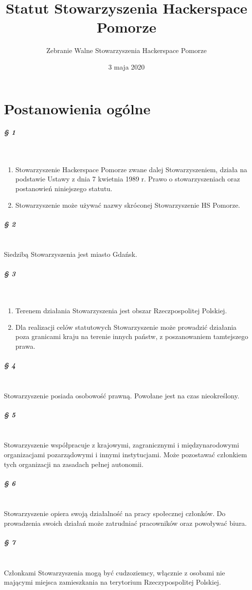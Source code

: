 \documentclass{article}
\title{Statut Stowarzyszenia Hackerspace Pomorze}
\author{Zebranie Walne Stowarzyszenia Hackerspace Pomorze}
\date{3 maja 2020}
\begin{document}
\setlength\parindent{0pt}
\renewcommand{\baselinestretch}{0} 

\renewcommand\thesection{Rozdział \Roman{section}.}

\newcommand{\myparagraph}[1]{\needspace{16ex}\begin{center}\subparagraph{#1}\end{center}\\}

\maketitle

\section{Postanowienia ogólne}
\myparagraph{§ 1}
\begin{enumerate}
\item
  Stowarzyszenie Hackerspace Pomorze zwane dalej Stowarzyszeniem, działa na podstawie Ustawy z dnia 7 kwietnia 1989 r. Prawo o stowarzyszeniach oraz postanowień niniejszego statutu.
\item
  Stowarzyszenie może używać nazwy skróconej Stowarzyszenie HS Pomorze.
\end{enumerate}

\myparagraph{§ 2}
Siedzibą Stowarzyszenia jest miasto Gdańsk.

\myparagraph{§ 3}
\begin{enumerate}
\item
  Terenem działania Stowarzyszenia jest obszar Rzeczpospolitej Polskiej.
\item
  Dla realizacji celów statutowych Stowarzyszenie może prowadzić działania poza granicami kraju na terenie innych państw, z poszanowaniem tamtejszego prawa.
\end{enumerate}

\myparagraph{§ 4}
Stowarzyszenie posiada osobowość prawną. Powołane jest na czas nieokreślony.

\myparagraph{§ 5}
Stowarzyszenie współpracuje z krajowymi, zagranicznymi i międzynarodowymi organizacjami pozarządowymi i innymi instytucjami. Może pozostawać członkiem tych organizacji na zasadach pełnej autonomii.

\myparagraph{§ 6}
Stowarzyszenie opiera swoją działalność na pracy społecznej członków. Do prowadzenia swoich działań może zatrudniać pracowników oraz powoływać biura.

\myparagraph{§ 7}
Członkami Stowarzyszenia mogą być cudzoziemcy, włącznie z osobami nie mającymi miejsca zamieszkania na terytorium Rzeczypospolitej Polskiej.
\end{document}
